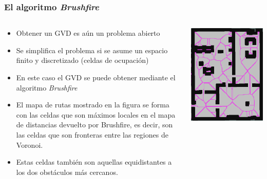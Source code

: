 \begin{frame}\frametitle{El algoritmo \textit{Brushfire}}
  \begin{columns}
    \begin{column}{0.65\textwidth}
      \begin{itemize}
      \item Obtener un GVD es aún un problema abierto
      \item Se simplifica el problema si se asume un espacio finito y discretizado (celdas de ocupación)
      \item En este caso el GVD se puede obtener mediante el algoritmo \textit{Brushfire}
      \item El mapa de rutas mostrado en la figura se forma con las celdas que son máximos locales en el mapa de distancias devuelto por Brushfire, es decir, son las celdas que son fronteras entre las regiones de Voronoi.
      \item Estas celdas también son aquellas equidistantes a los dos obstáculos más cercanos. 
      \end{itemize}
    \end{column}
    \begin{column}{0.35\textwidth}
      \includegraphics[width=\textwidth]{Figures/MotionPlanning/GVDFromGrid.png}
    \end{column}
  \end{columns}
\end{frame}

